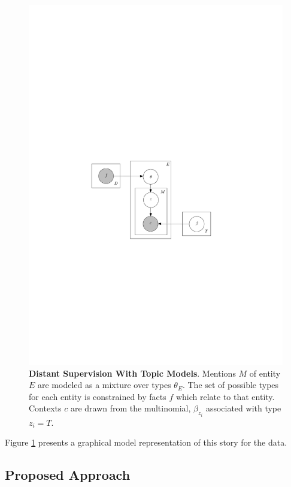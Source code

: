 \documentclass[12pt]{article}
\begin{document}
\begin{figure}
  \centering
  \includegraphics{llda.pdf}
  \caption{{\bf Distant Supervision With Topic Models}.  Mentions $M$ of entity $E$ are modeled as a mixture over types $\theta_E$.  The set of possible types
  for each entity is constrained by facts $f$ which relate to that entity.  Contexts $c$ are drawn from the multinomial, $\beta_{z_i}$ associated with type $z_i=T$.}
  \label{llda}
\end{figure}

Figure \ref{llda} presents a graphical model representation of this story for the data.


\subsection{Proposed Approach}
\end{document}
